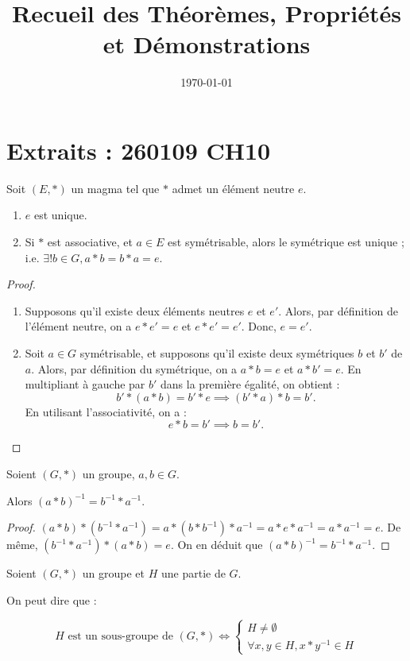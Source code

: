 \documentclass[12pt,a4paper]{report}
\title{Recueil des Théorèmes, Propriétés et Démonstrations}
\date{\today}
\begin{document}
\maketitle
\section*{Extraits : 260109 CH10}


\begin{property}
    Soit $(E,*)$ un magma tel que $*$ admet un élément neutre $e$.

    \begin{enumerate}
        \item $e$ est unique.
        \item Si $*$ est associative, et $a\in E$ est symétrisable, alors le symétrique est unique ; i.e. $\exists ! b \in G, a * b = b * a = e$.
    \end{enumerate}
\end{property}

\begin{proof}
    \begin{enumerate}
        \item Supposons qu'il existe deux éléments neutres $e$ et $e'$. Alors, par définition de l'élément neutre, on a $e*e' = e$ et $e*e' = e'$. Donc, $e = e'$.
        \item Soit $a\in G$ symétrisable, et supposons qu'il existe deux symétriques $b$ et $b'$ de $a$. Alors, par définition du symétrique, on a $a*b = e$ et $a*b' = e$. En multipliant à gauche par $b'$ dans la première égalité, on obtient :
        $$b'*(a*b) = b'*e \implies (b'*a)*b = b'.$$
        En utilisant l'associativité, on a :
        $$e*b = b' \implies b = b'.$$
    \end{enumerate}
\end{proof}

\begin{property}
    Soient $(G,*)$ un groupe, $a,b\in G$.

    Alors $(a*b)^{-1}=b^{-1} * a^{-1}$.
\end{property}

\begin{proof}
    $(a*b)*(b^{-1} * a^{-1}) = a*(b*b^{-1})*a^{-1} = a*e*a^{-1} = a*a^{-1} = e$.
    De même, $(b^{-1} * a^{-1})*(a*b) = e$.
    On en déduit que $(a*b)^{-1}=b^{-1} * a^{-1}$.
\end{proof}

\begin{property}
    Soient $(G,*)$ un groupe et $H$ une partie de $G$.

    On peut dire que :

    $$H \text{ est un sous-groupe de }(G,*) \iff \begin{cases}H\ne \emptyset\\ \forall x,y\in H, x*y^{-1} \in H\end{cases}$$
\end{property}
\end{document}
